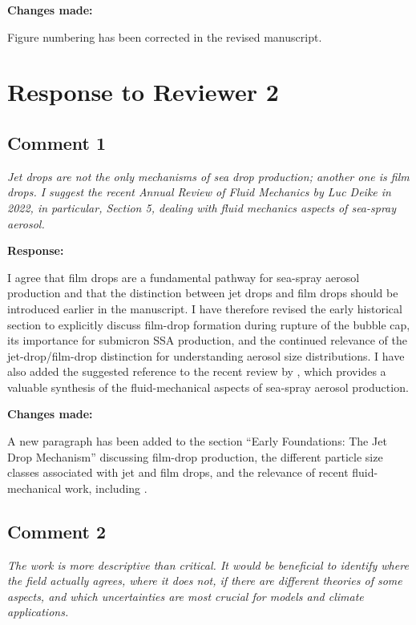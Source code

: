 \documentclass[11pt]{article}
\begin{document}
\textbf{Changes made:}

Figure numbering has been corrected in the revised manuscript.


\section*{Response to Reviewer 2}

\subsection*{Comment 1}

\emph{Jet drops are not the only mechanisms of sea drop production; another one is film drops. I suggest the recent Annual Review of Fluid Mechanics by Luc Deike in 2022, in particular, Section 5, dealing with fluid mechanics aspects of sea-spray aerosol.}

\textbf{Response:}

I agree that film drops are a fundamental pathway for sea-spray aerosol production and that the distinction between jet drops and film drops should be introduced earlier in the manuscript. I have therefore revised the early historical section to explicitly discuss film-drop formation during rupture of the bubble cap, its importance for submicron SSA production, and the continued relevance of the jet-drop/film-drop distinction for understanding aerosol size distributions. I have also added the suggested reference to the recent review by \citet{Deike2022}, which provides a valuable synthesis of the fluid-mechanical aspects of sea-spray aerosol production.

\textbf{Changes made:}

A new paragraph has been added to the section ``Early Foundations: The Jet Drop Mechanism'' discussing film-drop production, the different particle size classes associated with jet and film drops, and the relevance of recent fluid-mechanical work, including \citet{Deike2022}.

\subsection*{Comment 2}

\emph{The work is more descriptive than critical. It would be beneficial to identify where the field actually agrees, where it does not, if there are different theories of some aspects, and which uncertainties are most crucial for models and climate applications.}
\end{document}
